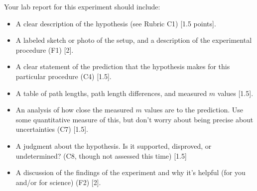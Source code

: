Your lab report for this experiment should include:
\begin{itemize}
	\item A clear description of the hypothesis (see Rubric C1) [1.5 points].
	
	\item A labeled sketch or photo of the setup, and a description of the experimental procedure (F1) [2].
	
	\item A clear statement of the prediction that the hypothesis makes for this particular procedure (C4) [1.5].

	\item A table of path lengths, path length differences, and measured $m$ values [1.5].
	
	\item An analysis of how close the measured $m$ values are to the prediction. Use some quantitative measure of this, but don't worry about being precise about uncertainties (C7) [1.5].
	
	\item A judgment about the hypothesis. Is it supported, disproved, or undetermined? (C8, though not assessed this time) [1.5]
	
	\item A discussion of the findings of the experiment and why it's helpful (for you and/or for science) (F2) [2].
\end{itemize}

